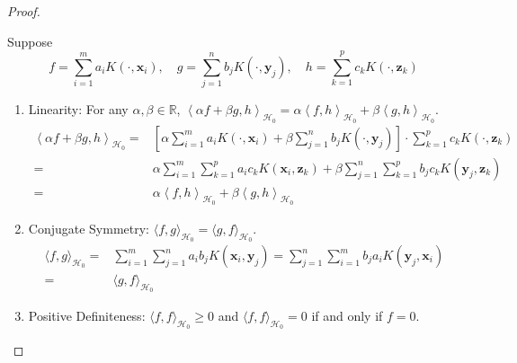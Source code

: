 \begin{proof}
\begin{enumerate}
              Suppose
              \begin{equation*}
                  f=\sum_{i=1}^{m}a_{i}K\left(\cdot,\mathbf{x}_{i}\right),\quad g=\sum_{j=1}^{n}b_{j}K\left(\cdot,\mathbf{y}_{j}\right),\quad h=\sum_{k=1}^{p}c_{k}K\left(\cdot,\mathbf{z}_{k}\right)
              \end{equation*}
              \begin{enumerate}
                  \item Linearity: For any $\alpha,\beta\in\mathbb{R}$, $\left\langle\alpha f+\beta g,h\right\rangle_{\mathcal{H}_{0}}=\alpha\left\langle f,h\right\rangle_{\mathcal{H}_{0}}+\beta\left\langle g,h\right\rangle_{\mathcal{H}_{0}}$.
                        \begin{equation*}
                            \begin{aligned}
                                \left\langle\alpha f+\beta g,h\right\rangle_{\mathcal{H}_{0}}= & \left[\alpha\sum_{i=1}^{m}a_{i}K\left(\cdot,\mathbf{x}_{i}\right)+\beta\sum_{j=1}^{n}b_{j}K\left(\cdot,\mathbf{y}_{j}\right)\right]\cdot\sum_{k=1}^{p}c_{k}K\left(\cdot,\mathbf{z}_{k}\right) \\
                                =                                                              & \alpha\sum_{i=1}^{m}\sum_{k=1}^{p}a_{i}c_{k}K\left(\mathbf{x}_{i},\mathbf{z}_{k}\right)+\beta\sum_{j=1}^{n}\sum_{k=1}^{p}b_{j}c_{k}K\left(\mathbf{y}_{j},\mathbf{z}_{k}\right)                \\
                                =                                                              & \alpha\left\langle f,h\right\rangle_{\mathcal{H}_{0}}+\beta\left\langle g,h\right\rangle_{\mathcal{H}_{0}}
                            \end{aligned}
                        \end{equation*}
                  \item Conjugate Symmetry: $\langle f,g\rangle_{\mathcal{H}_{0}}=\langle g,f\rangle_{\mathcal{H}_{0}}$.
                        \begin{equation*}
                            \begin{aligned}
                                \langle f,g\rangle_{\mathcal{H}_{0}}= & \sum_{i=1}^{m}\sum_{j=1}^{n}a_{i}b_{j}K\left(\mathbf{x}_{i},\mathbf{y}_{j}\right)=\sum_{j=1}^{n}\sum_{i=1}^{m}b_{j}a_{i}K\left(\mathbf{y}_{j},\mathbf{x}_{i}\right) \\
                                =                                     & \langle g,f\rangle_{\mathcal{H}_{0}}
                            \end{aligned}
                        \end{equation*}
                  \item Positive Definiteness: $\langle f,f\rangle_{\mathcal{H}_{0}}\geq 0$ and $\langle f,f\rangle_{\mathcal{H}_{0}}=0$ if and only if $f=0$.


\end{enumerate}
\end{enumerate}
\end{proof}
